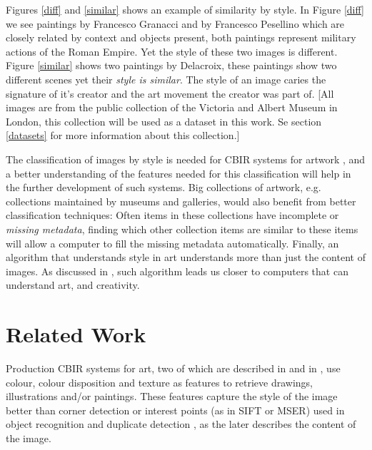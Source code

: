 \documentclass[a4paper,twocolumn]{article}
\begin{document}
Figures \ref{diff} and \ref{similar} shows an example of similarity by style.
In Figure \ref{diff} we see paintings by Francesco Granacci and by Francesco
Pesellino which are closely related by context and objects present, both
paintings represent military actions of the Roman Empire.  Yet the style of
these two images is different.  Figure \ref{similar} shows two paintings by
Delacroix, these paintings show two different scenes yet their \emph{style is
similar}.  The style of an image caries the signature of it's creator and the
art movement the creator was part of.  [All images are from the public
collection of the Victoria and Albert Museum in London, this collection will be
used as a dataset in this work.  Se section \ref{datasets} for more information
about this collection.]

The classification of images by style is needed for CBIR systems for artwork
\cite{cfsp12air,isv12mpeg}, and a better understanding of the features needed
for this classification will help in the further development of such systems.
Big collections of artwork, e.g. collections maintained by museums and
galleries, would also benefit from better classification techniques: Often
items in these collections have incomplete or \emph{missing metadata}, finding
which other collection items are similar to these items will allow a computer
to fill the missing metadata automatically.  Finally, an algorithm that
understands style in art understands more than just the content of images.  As
discussed in \cite{rmc12ajs}, such algorithm leads us closer to computers that
can understand art, and creativity.

\section{Related Work}

Production CBIR systems for art, two of which are described in \cite{cfsp12air}
and in \cite{ymvz03tree}, use colour, colour disposition and texture as
features to retrieve drawings, illustrations and/or paintings.  These features
capture the style of the image better than corner detection or interest points
(as in SIFT or MSER) used in object recognition and duplicate detection
\cite{szel11book}, as the later describes the content of the image.
\end{document}
